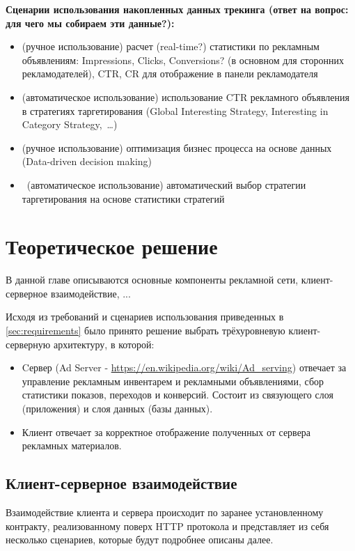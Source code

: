 \documentclass[specification,annotation,times]{itmo-student-thesis}
\begin{document}
\textbf{Сценарии использования накопленных данных трекинга (ответ на вопрос: для чего мы собираем эти данные?):}
\begin{itemize}
	\item (ручное использование) расчет (real-time?) статистики по рекламным объявлениям: Impressions, Clicks, Conversions? (в основном для сторонних рекламодателей), CTR, CR для отображение в панели рекламодателя
	\item (автоматическое использование) использование CTR рекламного объявления в стратегиях таргетирования (Global Interesting Strategy, Interesting in Category Strategy, …)
	\item (ручное использование) оптимизация бизнес процесса на основе данных (Data-driven decision making)
	\item  (автоматическое использование) автоматический выбор стратегии таргетирования на основе статистики стратегий
\end{itemize}


\chapterconclusion


\chapter{Теоретическое решение}

В данной главе описываются основные компоненты рекламной сети, клиент-серверное взаимодействие, ...

Исходя из требований и сценариев использования приведенных в \ref{sec:requirements} было принято решение выбрать трёхуровневую клиент-серверную архитектуру, в которой:
\begin{itemize}
	\item Cервер (Ad Server - \url{https://en.wikipedia.org/wiki/Ad_serving}) отвечает за управление рекламным инвентарем и рекламными объявлениями, сбор статистики показов, переходов и конверсий. Состоит из связующего слоя (приложения) и слоя данных (базы данных).
	\item Клиент отвечает за корректное отображение полученных от сервера рекламных материалов.
\end{itemize}

\section{Клиент-серверное взаимодействие}

Взаимодействие клиента и сервера происходит по заранее установленному контракту, реализованному поверх HTTP протокола и представляет из себя несколько сценариев, которые будут подробнее описаны далее.
\end{document}

